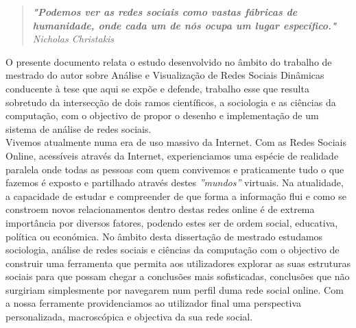 
\begin{quote}
\textit{\textbf{"Podemos ver as redes sociais como vastas fábricas de humanidade, onde cada um de nós ocupa um lugar específico."} Nicholas Christakis}
\end{quote}

O presente documento relata o estudo desenvolvido no âmbito do trabalho de mestrado do autor
sobre Análise e Visualização de Redes Sociais Dinâmicas conducente à tese que aqui se expõe e defende, trabalho esse que resulta sobretudo da intersecção de dois ramos científicos, a sociologia e as ciências da computação, com o objectivo de propor o desenho e implementação de um sistema de análise de redes sociais.\\

Vivemos atualmente numa era de uso massivo da Internet. Com as Redes Sociais Online, acessíveis através da Internet,
experienciamos uma espécie de realidade paralela onde todas as pessoas com quem convivemos e praticamente tudo o que fazemos é exposto e partilhado através destes \textit{''mundos''} virtuais. Na atualidade, a capacidade de estudar e compreender de que forma a informação flui e como se constroem novos relacionamentos dentro destas redes online é de extrema importância por diversos fatores, podendo estes ser de ordem social, educativa, política ou económica. No âmbito desta dissertação de mestrado estudamos sociologia, análise de redes sociais e ciências da computação com o objectivo de construir uma ferramenta que permita aos utilizadores explorar as suas estruturas sociais para que possam chegar a conclusões mais sofisticadas, conclusões que não surgiriam simplesmente por navegarem num perfil duma rede social online. Com a nossa ferramente providenciamos ao utilizador final uma perspectiva personalizada, macroscópica e objectiva da sua rede social.